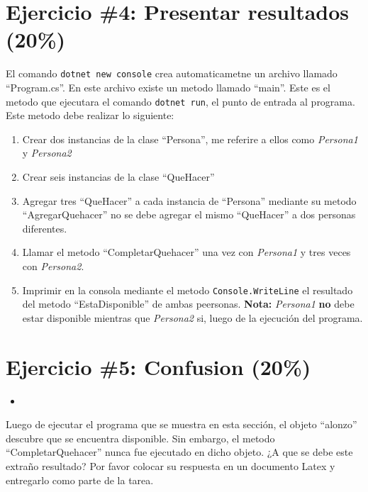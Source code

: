 \documentclass{article}
\newcommand{\perlscript}[2]{
\begin{itemize}
\item[]
\end{itemize}
}
\begin{document}
\section*{Ejercicio \#4: Presentar resultados (20\%)}
El comando \texttt{dotnet new console} crea automaticametne un archivo llamado
``Program.cs''. En este archivo existe un metodo llamado ``main''. Este es el
metodo que ejecutara el comando \texttt{dotnet run}, el punto de entrada al
programa. Este metodo debe realizar lo siguiente:
\begin{enumerate}
        \item{Crear dos instancias de la clase ``Persona'', me referire a ellos
                como \emph{Persona1} y \emph{Persona2}}
        \item{Crear seis instancias de la clase ``QueHacer''}
        \item{Agregar tres ``QueHacer'' a cada instancia de ``Persona'' mediante
                su metodo ``AgregarQuehacer'' no se debe agregar el mismo
                ``QueHacer'' a dos personas diferentes.}
        \item{Llamar el metodo ``CompletarQuehacer'' una vez con \emph{Persona1}
                y tres veces con \emph{Persona2}.}
        \item{Imprimir en la consola mediante el metodo \texttt{Console.WriteLine}
                el resultado del metodo ``EstaDisponible'' de ambas peersonas.
                {\bf Nota:} \emph{Persona1} {\bf no} debe estar disponible mientras que
                \emph{Persona2} si, luego de la ejecuci\'on del programa.}
\end{enumerate}

\section*{Ejercicio \#5: Confusion (20\%)}

\perlscript{./Programa}{Confusion}

Luego de ejecutar el programa que se muestra en esta secci\'on, el objeto
``alonzo'' descubre que se encuentra disponible. Sin embargo, el metodo
``CompletarQuehacer'' nunca fue ejecutado en dicho objeto. ¿A que se debe
este extra\~no resultado? Por favor colocar su respuesta en un documento Latex
y entregarlo como parte de la tarea.

%
%
\end{document}
